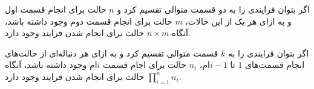 \begin{definition}
    اگر بتوان فرایندی را به دو قسمت متوالی تقسیم کرد و
    $n$
    حالت برای انجام قسمت اول و به ازای هر یک از این حالات،
    $m$
    حالت برای انجام قسمت دوم وجود داشته باشد،
    آنگاه
    $n \times m$
    حالت برای انجام شدن فرایند وجود دارد.
\end{definition}
    
\begin{fact}    
    اگر بتوان فرایندی را به
    $k$
    قسمت متوالی تقسیم کرد و
    به ازای هر دنباله‌ای از حالت‌های انجام قسمت‌های 
    $1$ تا $i-1$ام،
    $n_i$
    حالت برای اجام قسمت
    $i$ام
    وجود داشته باشد،
    آنگاه
    $\prod\limits_{i=1}^n n_i$
    حالت برای انجام شدن فرایند وجود دارد.
\end{fact}





